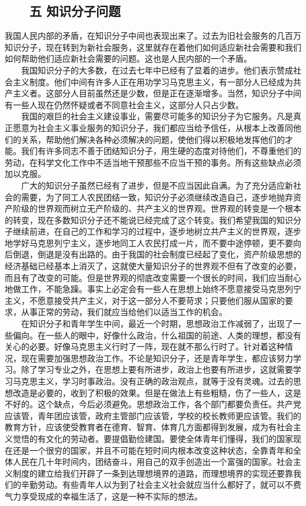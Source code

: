 \documentclass[cn,11pt,chinese]{elegantbook}
\def\myformat#1{\hfil\hfil #1}
\begin{document}
\subsection*{\myformat{　　五 知识分子问题}}
我国人民内部的矛盾，在知识分子中间也表现出来了。过去为旧社会服务的几百万知识分子，现在转到为新社会服务，这里就存在着他们如何适应新社会需要和我们如何帮助他们适应新社会需要的问题。这也是人民内部的一个矛盾。\\
　　我国知识分子的大多数，在过去七年中已经有了显着的进步。他们表示赞成社会主义制度。他们中间有许多人正在用功学习马克思主义，有一部分人已经成为共产主义者。这部分人目前虽然还是少数，但是正在逐渐增多。当然，知识分子中间有一些人现在仍然怀疑或者不同意社会主义，这部分人只占少数。\\
　　我国的艰巨的社会主义建设事业，需要尽可能多的知识分子为它服务。凡是真正愿意为社会主义事业服务的知识分子，我们都应当给予信任，从根本上改善同他们的关系，帮助他们解决各种必须解决的问题，使他们得以积极地发挥他们的才能。我们有许多同志不善于团结知识分子，用生硬的态度对待他们，不尊重他们的劳动，在科学文化工作中不适当地干预那些不应当干预的事务。所有这些缺点必须加以克服。\\
　　广大的知识分子虽然已经有了进步，但是不应当因此自满。为了充分适应新社会的需要，为了同工人农民团结一致，知识分子必须继续改造自己，逐步地抛弃资产阶级的世界观而树立无产阶级的、共产主义的世界观。世界观的转变是一个根本的转变，现在多数知识分子还不能说已经完成了这个转变。我们希望我国的知识分子继续前进，在自己的工作和学习的过程中，逐步地树立共产主义的世界观，逐步地学好马克思列宁主义，逐步地同工人农民打成一片，而不要中途停顿，更不要向后倒退，倒退是没有出路的。由于我国的社会制度已经起了变化，资产阶级思想的经济基础已经基本上消灭了，这就使大量知识分子的世界观不但有了改变的必要，而且有了改变的可能。但是世界观的彻底改变需要一个很长的时间，我们应当耐心地做工作，不能急躁。事实上必定会有一些人在思想上始终不愿意接受马克思列宁主义，不愿意接受共产主义，对于这一部分人不要苛求；只要他们服从国家的要求，从事正常的劳动，我们就应当给他们以适当工作的机会。\\
　　在知识分子和青年学生中间，最近一个时期，思想政治工作减弱了，出现了一些偏向。在一些人的眼中，好像什么政治，什么祖国的前途、人类的理想，都没有关心的必要。好像马克思主义行时了一阵，现在就不那么行时了。针对着这种情况，现在需要加强思想政治工作。不论是知识分子，还是青年学生，都应该努力学习。除了学习专业之外，在思想上要有所进步，政治上也要有所进步，这就需要学习马克思主义，学习时事政治。没有正确的政治观点，就等于没有灵魂。过去的思想改造是必要的，收到了积极的效果。但是在做法上有些粗糙，伤了一些人，这是不好的。这个缺点，今后必须避免。思想政治工作，各个部门都要负责任。共产党应该管，青年团应该管，政府主管部门应该管，学校的校长教师更应该管。我们的教育方针，应该使受教育者在德育、智育、体育几方面都得到发展，成为有社会主义觉悟的有文化的劳动者。要提倡勤俭建国。要使全体青年们懂得，我们的国家现在还是一个很穷的国家，并且不可能在短时间内根本改变这种状态，全靠青年和全体人民在几十年时间内，团结奋斗，用自己的双手创造出一个富强的国家。社会主义制度的建立给我们开辟了一条到达理想境界的道路，而理想境界的实现还要靠我们的辛勤劳动。有些青年人以为到了社会主义社会就应当什么都好了，就可以不费气力享受现成的幸福生活了，这是一种不实际的想法。\\
\end{document}
